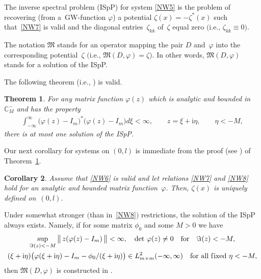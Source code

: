 \documentclass[11pt]{article}
\newtheorem{Theorem}{Theorem}[section]
\newtheorem{Corollary}[Theorem]{Corollary}
\def\vp{\varphi}
\def\BC{{\mathbb C}}
\newcommand{\I}{\mathrm{i}}
\def\mf{\mathfrak}
\numberwithin{equation}{section}
\begin{document}
The inverse spectral problem (ISpP) for system
\eqref{NW5} is the problem of recovering (from a~GW-function $\varphi$)
a potential
$\zeta (x) = - \zeta^* (x)$
 such that~\eqref{NW7} is valid and the diagonal entries~$\zeta_{kk}$ of~$\zeta$ equal zero $($i.e., $\zeta_{kk} \equiv 0)$.

\begin{Notation}
The notation $\mf M$
stands for
an operator mapping the pair $D$ and~$\varphi $
into the corresponding potential~$\zeta$
$($i.e., ${\mf M} (D, \varphi) = \zeta)$. In other words, ${\mf M} (D, \varphi)$ stands for a solution of the ISpP.
\end{Notation}


\noindent The following theorem (i.e., \cite[Theorem 4.8]{SaSaR}) is valid.
\begin{Theorem}\label{NWTmUniq}
For any
matrix function
$\varphi (z)$ which is
analytic and bounded in
$\BC^{-}_M$
and has the
property
\begin{gather}
  \int_{- \infty}^\infty
   \bigl(
    \varphi (z) - I_m
   \bigr)^*
   \bigl(
    \varphi (z) - I_m
   \bigr)
  d \xi
  < \infty,
\qquad
  z = \xi + \I \eta,
  \qquad
  \eta <- M ,
 \label{NW8}
\end{gather}
there is at most one solution of the ISpP.
\end{Theorem}
Our next corollary for systems on $(0,l)$ is immediate from the proof (see \cite[pp.~108--109]{SaSaR}) of Theorem~\ref{NWTmUniq}.

\begin{Corollary} \label{CyUniq} Assume that \eqref{NW6} is valid and let relations \eqref{NW7} and \eqref{NW8} hold
for an analytic and bounded matrix function~$\vp$. Then, $\zeta(x)$ is uniquely defined on~$(0,l)$.
\end{Corollary}

\begin{Remark}\label{NWInvPr} Under somewhat stronger $($than in~\eqref{NW8}$)$
restrictions, the solution of the ISpP always exists. Namely, if for some matrix $\phi_0$ and some $M>0$
 we have
\begin{gather} \label{NW9}
\sup_{\Im(z)<-M}
   \big\| \,
   z ( \varphi (z) - I_m) \,
   \big\|
   < \infty, \quad \det \, \varphi (z) \not= 0 \quad {\mathrm{for}} \quad \Im(z) <-M,
     \\
   (\xi+\I\eta)\big( \varphi (\xi+\I\eta) - I_m - \phi_0 / (\xi+\I \eta) \big)
   \in L_{m \times m}^2 (- \infty, \infty)
   \quad \text{for all f\/ixed} \
   \eta<-M,
 \label{NW10}
\end{gather}
then ${\mf M} (D, \varphi)$ is constructed in \cite[Theorem~4.10]{SaSaR}.
\end{Remark}
\end{document}
